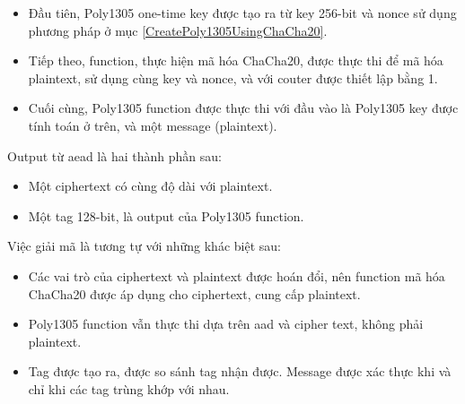\begin{itemize}
    \item Đầu tiên, Poly1305 one-time key được tạo ra từ key 256-bit và nonce sử dụng phương pháp ở mục \ref{CreatePoly1305UsingChaCha20}.
    \item Tiếp theo, function, thực hiện mã hóa ChaCha20, được thực thi để mã hóa plaintext, sử dụng cùng key và nonce, và với couter được thiết lập bằng 1.
    \item Cuối cùng, Poly1305 function được thực thi với đầu vào là Poly1305 key được tính toán ở trên, và một message (plaintext).
\end{itemize}

Output từ \acrshort{aead} là hai thành phần sau:
\begin{itemize}
    \item Một ciphertext có cùng độ dài với plaintext.
    \item Một tag 128-bit, là output của Poly1305 function.
\end{itemize}

Việc giải mã là tương tự với những khác biệt sau:
\begin{itemize}
    \item Các vai trò của ciphertext và plaintext được hoán đổi, nên function mã hóa ChaCha20 được áp dụng cho ciphertext, cung cấp plaintext.
    \item Poly1305 function vẫn thực thi dựa trên \acrshort{aad} và cipher text, không phải plaintext.
    \item Tag được tạo ra, được so sánh tag nhận được. Message được xác thực khi và chỉ khi các tag trùng khớp với nhau.
\end{itemize}